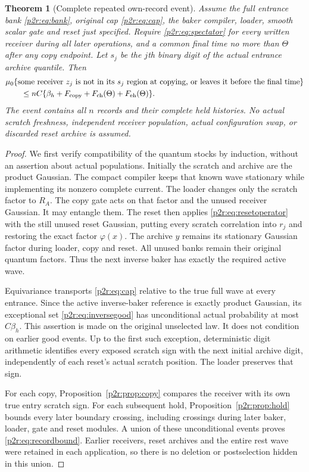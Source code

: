 \documentclass[11pt]{article}
\numberwithin{equation}{section}
\newtheorem{theorem}{Theorem}[section]
\theoremstyle{definition}
\theoremstyle{remark}
\begin{document}
\begin{theorem}[Complete repeated own-record event]
\label{p2r:thm:records}
Assume the full entrance bank \eqref{p2r:eq:bank}, original cap
\eqref{p2r:eq:cap}, the baker compiler, loader, smooth scalar
gate and reset just specified. Require
\eqref{p2r:eq:spectator} for every written receiver during all
later operations, and a common final time no more than
$\Theta$ after any copy endpoint. Let $s_j$ be the $j$th
binary digit of the actual entrance archive quantile.
Then
\begin{align}
 &\mu_0\{\text{some receiver }z_j\text{ is not in its }s_j
       \text{ region at copying, or leaves it before the final time}\}
 \notag\\
 &\qquad\leq nC\{\beta_h+F_{\rm copy}
                         +F_{\rm ch}(\Theta)+F_{\rm eh}(\Theta)\}.
 \label{p2r:eq:recordbound}
\end{align}
The event contains all $n$ records and their complete held
histories. No actual scratch freshness, independent receiver
population, actual configuration swap, or discarded reset
archive is assumed.
\end{theorem}
\begin{proof}
We first verify compatibility of the quantum stocks by induction,
without an assertion about actual populations. Initially the
scratch and archive are the product Gaussian. The compact
compiler keeps that known wave stationary while implementing
its nonzero complete current. The loader changes only the
scratch factor to $R_A$. The copy gate acts on that factor and
the unused receiver Gaussian. It may entangle them.
The reset then applies \eqref{p2r:eq:resetoperator} with the
still unused reset Gaussian, putting every scratch
correlation into $r_j$ and restoring the exact factor
$\varphi(x)$. The archive $y$ remains its stationary Gaussian
factor during loader, copy and reset. All unused banks remain
their original quantum factors. Thus the next inverse baker
has exactly the required active wave.

Equivariance transports \eqref{p2r:eq:cap} relative to the true
full wave at every entrance. Since the active inverse-baker
reference is exactly product Gaussian, its exceptional set
\eqref{p2r:eq:inversegood} has unconditional actual probability
at most $C\beta_h$. This assertion is made on the original
unselected law. It does not condition on earlier good events.
Up to the first such exception, deterministic digit arithmetic
identifies every exposed scratch sign with the next initial
archive digit, independently of each reset's actual scratch
position. The loader preserves that sign.

For each copy, Proposition~\ref{p2r:prop:copy} compares the
receiver with its own true entry scratch sign. For each
subsequent hold, Proposition~\ref{p2r:prop:hold} bounds every
later boundary crossing, including crossings during later
baker, loader, gate and reset modules. A union of these
unconditional events proves \eqref{p2r:eq:recordbound}.
Earlier receivers, reset archives and the entire rest wave
were retained in each application, so there is no deletion
or postselection hidden in this union.
\end{proof}
\end{document}
